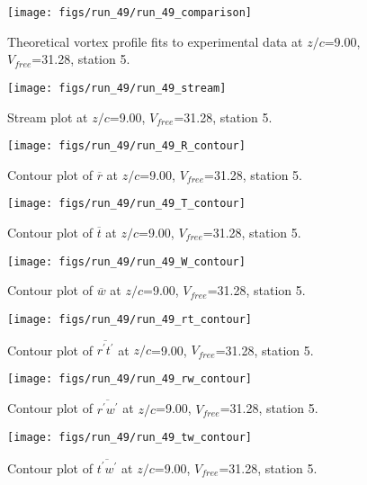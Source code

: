 \begin{figure}[H]
\centering
\texttt{[image: figs/run\_49/run\_49\_comparison]}
\caption{Theoretical vortex profile fits to experimental data at $z/c$=9.00, $V_{free}$=31.28, station 5.}
\label{fig:run_49_comparison}
\end{figure}


\begin{figure}[H]
\centering
\texttt{[image: figs/run\_49/run\_49\_stream]}
\caption{Stream plot at $z/c$=9.00, $V_{free}$=31.28, station 5.}
\label{fig:run_49_stream}
\end{figure}


\begin{figure}[H]
\centering
\texttt{[image: figs/run\_49/run\_49\_R\_contour]}
\caption{Contour plot of $\overline{r}$ at $z/c$=9.00, $V_{free}$=31.28, station 5.}
\label{fig:run_49_R_contour}
\end{figure}


\begin{figure}[H]
\centering
\texttt{[image: figs/run\_49/run\_49\_T\_contour]}
\caption{Contour plot of $\overline{t}$ at $z/c$=9.00, $V_{free}$=31.28, station 5.}
\label{fig:run_49_T_contour}
\end{figure}


\begin{figure}[H]
\centering
\texttt{[image: figs/run\_49/run\_49\_W\_contour]}
\caption{Contour plot of $\overline{w}$ at $z/c$=9.00, $V_{free}$=31.28, station 5.}
\label{fig:run_49_W_contour}
\end{figure}


\begin{figure}[H]
\centering
\texttt{[image: figs/run\_49/run\_49\_rt\_contour]}
\caption{Contour plot of $\overline{r^\prime t^\prime}$ at $z/c$=9.00, $V_{free}$=31.28, station 5.}
\label{fig:run_49_rt_contour}
\end{figure}


\begin{figure}[H]
\centering
\texttt{[image: figs/run\_49/run\_49\_rw\_contour]}
\caption{Contour plot of $\overline{r^\prime w^\prime}$ at $z/c$=9.00, $V_{free}$=31.28, station 5.}
\label{fig:run_49_rw_contour}
\end{figure}


\begin{figure}[H]
\centering
\texttt{[image: figs/run\_49/run\_49\_tw\_contour]}
\caption{Contour plot of $\overline{t^\prime w^\prime}$ at $z/c$=9.00, $V_{free}$=31.28, station 5.}
\label{fig:run_49_tw_contour}
\end{figure}


